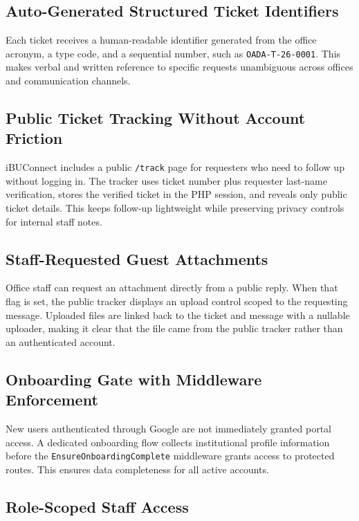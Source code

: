 \documentclass[12pt,a4paper]{article}
\newcommand{\code}[1]{\texttt{#1}}
\begin{document}
\subsection{Auto-Generated Structured Ticket Identifiers}

Each ticket receives a human-readable identifier generated from the office acronym, a type code, and a sequential number, such as \code{OADA-T-26-0001}. This makes verbal and written reference to specific requests unambiguous across offices and communication channels.

\subsection{Public Ticket Tracking Without Account Friction}

iBUConnect includes a public \code{/track} page for requesters who need to follow up without logging in. The tracker uses ticket number plus requester last-name verification, stores the verified ticket in the PHP session, and reveals only public ticket details. This keeps follow-up lightweight while preserving privacy controls for internal staff notes.

\subsection{Staff-Requested Guest Attachments}

Office staff can request an attachment directly from a public reply. When that flag is set, the public tracker displays an upload control scoped to the requesting message. Uploaded files are linked back to the ticket and message with a nullable uploader, making it clear that the file came from the public tracker rather than an authenticated account.

\subsection{Onboarding Gate with Middleware Enforcement}

New users authenticated through Google are not immediately granted portal access. A dedicated onboarding flow collects institutional profile information before the \code{EnsureOnboardingComplete} middleware grants access to protected routes. This ensures data completeness for all active accounts.

\subsection{Role-Scoped Staff Access}
\end{document}
